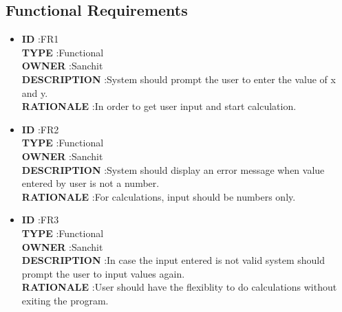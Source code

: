 \documentclass[a4paper,12pt]{article}
\begin{document}
\subsection{Functional Requirements}
\begin{itemize}
	
	\item \textbf{ID } \hspace{3cm} :FR1  \\
	\textbf{TYPE } \hspace{2.27cm}  :Functional\\
	\textbf{OWNER } \hspace{1.75cm} :Sanchit \\
	\textbf{DESCRIPTION }\hspace{0.35cm} :System should prompt the user to enter the value of x and y. \\
	\textbf{RATIONALE } \hspace{0.75cm} :In order to get user input and start calculation. \\
	
	
	\item \textbf{ID } \hspace{3cm} :FR2  \\
	\textbf{TYPE } \hspace{2.27cm}  :Functional\\
	\textbf{OWNER } \hspace{1.75cm} :Sanchit \\
	\textbf{DESCRIPTION }\hspace{0.35cm} :System should display an error message when value entered by user is not a number. \\
	\textbf{RATIONALE } \hspace{0.75cm} :For calculations, input should be numbers only.  \\
	
	
	\item \textbf{ID } \hspace{3cm} :FR3  \\
	\textbf{TYPE } \hspace{2.27cm}  :Functional\\
	\textbf{OWNER } \hspace{1.75cm} :Sanchit \\
	\textbf{DESCRIPTION }\hspace{0.35cm} :In case the input entered is not valid system should prompt the user to input values again. \\
	\textbf{RATIONALE } \hspace{0.75cm} :User should have the flexiblity to do calculations without exiting the program.  \\
	

\end{itemize}
\end{document}
